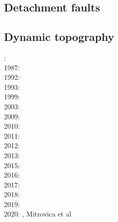 \subsection{Detachment faults} 

{\scriptsize
\noindent
\cite{werr07}
\cite{jaml10}
\cite{rera11}
\cite{matv15}
\cite{gubg19}
}

\subsection{Dynamic topography} 

{\scriptsize
{}: \cite{hacr85}\\
1987: \cite{repa87}\\
1992: \cite{kiha92}\\
1993: \cite{gurn93}\cite{gurn93b}\\
1999: \cite{bumo99}\\
2003: \cite{cogu03}\\
2009: \cite{cohu09}\\
2010: \cite{bofb10}\cite{brau10}\cite{stfh10}\cite{shml10}\\
2011: \cite{rapy11}\\
2012: \cite{shlm12}\cite{zhzf12}\\
2013: \cite{brrs13}\cite{flgm13}\\
2015: \cite{aupm15}\cite{kiff15}\cite{dali15}\\
2016: \cite{howa16}\cite{gvfb16}\cite{yagu16}\cite{stei16}\cite{cogb16}\\
2017: \cite{yamm17}\cite{aumh17}\cite{grrb17}\\
2018: \cite{osss18}\cite{vibc18}\\
2019: \cite{deli19}\cite{davk19}\cite{bore19}\\
2020: \cite{braf20}, Mitrovica et al \cite{miac20}
}

